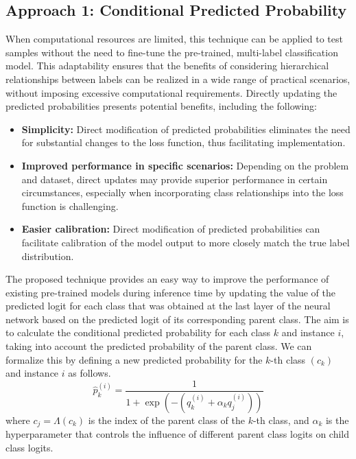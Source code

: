 \documentclass[final,1p,times,authoryear]{elsarticle}
\begin{document}
\subsection{Approach 1: Conditional Predicted Probability}\label{subsec:taxonomy.method.approach1}
When computational resources are limited, this technique can be applied to test samples without the need to fine-tune the pre-trained, multi-label classification model. This adaptability ensures that the benefits of considering hierarchical relationships between labels can be realized in a wide range of practical scenarios, without imposing excessive computational requirements.
Directly updating the predicted probabilities presents potential benefits, including the following:
\begin{itemize}
    \item  \textbf{Simplicity:} Direct modification of predicted probabilities eliminates the need for substantial changes to the loss function, thus facilitating implementation.
    \item  \textbf{Improved performance in specific scenarios:} Depending on the problem and dataset, direct updates may provide superior performance in certain circumstances, especially when incorporating class relationships into the loss function is challenging.
    \item  \textbf{Easier calibration:} Direct modification of predicted probabilities can facilitate calibration of the model output to more closely match the true label distribution.
\end{itemize}

The proposed technique provides an easy way to improve the performance of existing pre-trained models during inference time by updating the value of the predicted logit for each class that was obtained at the last layer of the neural network based on the predicted logit of its corresponding parent class. The aim is to calculate the conditional predicted probability for each class $k $ and instance $i $, taking into account the predicted probability of the parent class. We can formalize this by defining a new predicted probability for the $k$-th class $(c_k) $ and instance $i $ as follows.
\begin{equation}
    \widehat{p}_k^{(i)} = \frac{1}{ 1 + \exp \left(-\left(q_k^{(i)} + \alpha_k q_j^{(i)} \right)\right) }
    \label{eq:taxonomy.eq.1.pred.approach1}
\end{equation}
where $c_j = \Lambda (c_k)$ is the index of the parent class of the $k$-th class, and $\alpha_k $ is the hyperparameter that controls the influence of different parent class logits on child class logits.
\end{document}
